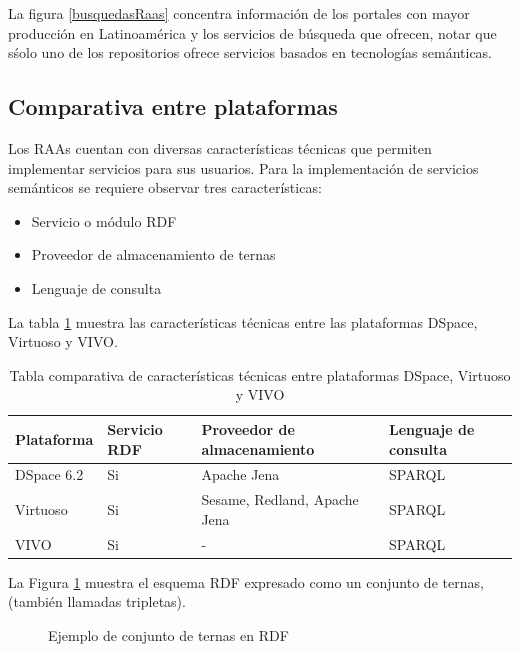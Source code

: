 La figura \ref{busquedasRaas} concentra informaci\'on de los portales con mayor producci\'on en Latinoam\'erica y los servicios de b\'usqueda que ofrecen, notar que s\'solo uno de los repositorios ofrece servicios basados en tecnolog\'ias sem\'anticas.
\subsection{Comparativa entre plataformas}

Los RAAs cuentan con diversas caracter\'isticas t\'ecnicas que permiten implementar servicios para sus usuarios. Para la implementaci\'on de servicios sem\'anticos se requiere observar tres caracter\'isticas:

\begin{itemize}
    \item Servicio o m\'odulo RDF
    \item Proveedor de almacenamiento de ternas
    \item Lenguaje de consulta
\end{itemize}{}

La tabla \ref{tabla_comparativa} muestra las caracter\'isticas t\'ecnicas entre las plataformas DSpace, Virtuoso y VIVO.\newline

\begin{table}[htbp]
    \begin{center}
    \caption{Tabla comparativa de caracter\'isticas t\'ecnicas entre plataformas DSpace, Virtuoso y VIVO}
    \begin{tabular}{| p{4cm}| p{3cm} |p{4cm} | p{3cm} |}
    \hline
    \centering \textbf{Plataforma} & \textbf{Servicio RDF} & \textbf{Proveedor de almacenamiento} & \textbf{Lenguaje de consulta} \\
    \hline \hline
    DSpace 6.2 & Si & Apache Jena & SPARQL \\ \hline
    Virtuoso & Si & Sesame, Redland, Apache Jena & SPARQL \\ \hline
    VIVO & Si & - & SPARQL \\ \hline
    \end{tabular}
    \label{tabla_comparativa}
    \end{center}
\end{table}

La Figura \ref{ejemploRDFternas} muestra el esquema RDF expresado como un conjunto de ternas, (tambi\'en llamadas tripletas).\newline

\begin{figure}[!ht]
    \centering
    \caption{Ejemplo de conjunto de ternas en RDF} %
    \label{ejemploRDFternas}
\end{figure}
  